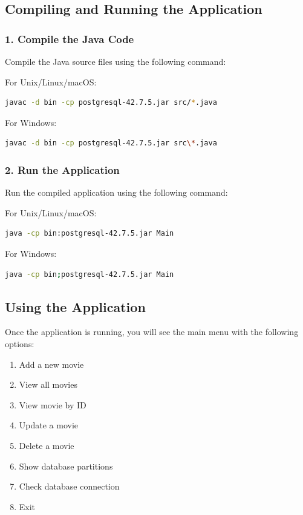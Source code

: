 \documentclass[twoside]{article}
\begin{document}
\subsection{Compiling and Running the Application}

\subsubsection{1. Compile the Java Code}

Compile the Java source files using the following command:

For Unix/Linux/macOS:
\begin{lstlisting}[language=bash, caption=Compiling on Unix/Linux/macOS]
javac -d bin -cp postgresql-42.7.5.jar src/*.java
\end{lstlisting}

For Windows:
\begin{lstlisting}[language=bash, caption=Compiling on Windows]
javac -d bin -cp postgresql-42.7.5.jar src\*.java
\end{lstlisting}

\subsubsection{2. Run the Application}

Run the compiled application using the following command:

For Unix/Linux/macOS:
\begin{lstlisting}[language=bash, caption=Running on Unix/Linux/macOS]
java -cp bin:postgresql-42.7.5.jar Main
\end{lstlisting}

For Windows:
\begin{lstlisting}[language=bash, caption=Running on Windows]
java -cp bin;postgresql-42.7.5.jar Main
\end{lstlisting}

\subsection{Using the Application}

Once the application is running, you will see the main menu with the following options:

\begin{enumerate}
  \item Add a new movie
  \item View all movies
  \item View movie by ID
  \item Update a movie
  \item Delete a movie
  \item Show database partitions
  \item Check database connection
  \item Exit
\end{enumerate}
\end{document}
